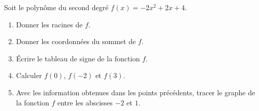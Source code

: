 
\begin{exercice}\label{exoPremiere-0097}

    Soit le polynôme du second degré \( f(x)=-2x^2+2x+4\).
    \begin{multicols}{2}
        \begin{enumerate}
            \item
                Donner les racines de \( f\).
            \item
                Donner les coordonnées du sommet de \( f\).
            \item
                Écrire le tableau de signe de la fonction \( f\).
            \item
                Calculer \( f(0)\), \( f(-2)\) et \( f(3)\).
            \item
                Avec les information obtenues dans les points précédents, tracer le graphe de la fonction \( f\) entre les abscisses \( -2\) et \( 1\).
        \end{enumerate}
    \end{multicols}

\end{exercice}
